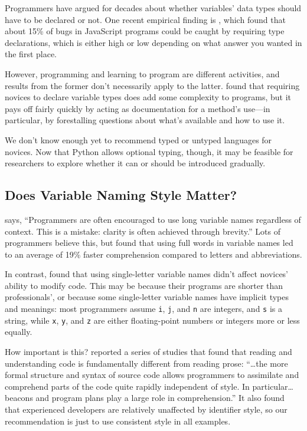 Programmers have argued for decades about whether variables' data types
should have to be declared or not. One recent empirical finding is
\cite{Gao2017}, which found that about 15\% of bugs in JavaScript
programs could be caught by requiring type declarations, which is either
high or low depending on what answer you wanted in the first place.

However, programming and learning to program are different activities,
and results from the former don't necessarily apply to the latter.
\cite{Endr2014} found that requiring novices to declare variable
types does add some complexity to programs, but it pays off fairly
quickly by acting as documentation for a method's use---in particular, by
forestalling questions about what's available and how to use it.

We don't know enough yet to recommend typed or untyped languages for
novices. Now that Python allows optional typing, though, it may be
feasible for researchers to explore whether it can or should be
introduced gradually.

\subsection*{Does Variable Naming Style Matter?}

\cite{Kern1999} says, ``Programmers are often encouraged to use long
variable names regardless of context. This is a mistake: clarity is
often achieved through brevity.'' Lots of programmers believe this, but
\cite{Hofm2017} found that using full words in variable names led to
an average of 19\% faster comprehension compared to letters and
abbreviations.

In contrast, \cite{Beni2017} found that using single-letter variable
names didn't affect novices' ability to modify code. This may be because
their programs are shorter than professionals', or because some
single-letter variable names have implicit types and meanings: most
programmers assume \texttt{i}, \texttt{j}, and \texttt{n} are integers, and \texttt{s} is a string,
while \texttt{x}, \texttt{y}, and \texttt{z} are either floating-point numbers or integers
more or less equally.

How important is this? \cite{Bink2012} reported a series of studies
that found that reading and understanding code is fundamentally
different from reading prose: ``{\ldots}the more formal structure
and syntax of source code allows programmers to assimilate and
comprehend parts of the code quite rapidly independent of style. In
particular{\ldots}beacons and program plans play a large role in
comprehension.'' It also found that experienced developers are relatively
unaffected by identifier style, so our recommendation is just to use
consistent style in all examples.


